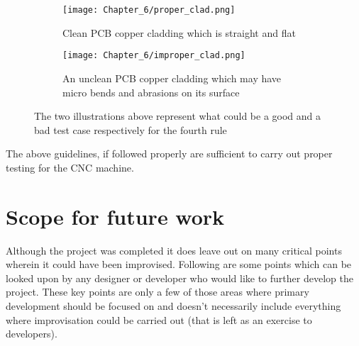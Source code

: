 \begin{enumerate}
   \begin{figure}[h]

    \begin{subfigure}{0.5\textwidth}
    \hspace{8mm}
        \texttt{[image: Chapter\_6/proper\_clad.png]}
        \caption{Clean PCB copper cladding which is straight and flat}
        \label{fig:pclad}
    \end{subfigure}
    \begin{subfigure}{0.5\textwidth}
    \hspace{8mm}
        \texttt{[image: Chapter\_6/improper\_clad.png]}
        \caption{An unclean PCB copper cladding which may have micro bends and abrasions on its surface}
        \label{fig:iclad}
    \end{subfigure}

    \caption{The two illustrations above represent what could be a good and a bad test case respectively for the fourth rule}
    \label{fig:piclad}
    \end{figure} 

\end{enumerate}

The above guidelines, if followed properly are sufficient to carry out proper testing for the CNC machine.

\section{Scope for future work}

Although the project was completed it does leave out on many critical points wherein it could have been improvised. Following are some points which can be looked upon by any designer or developer who would like to further develop the project. These key points are only a few of those areas where primary development should be focused on and doesn’t necessarily include everything where improvisation could be carried out (that is left as an exercise to developers).

